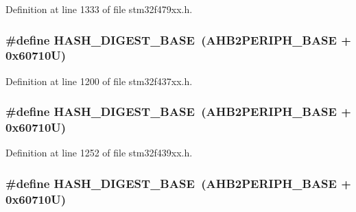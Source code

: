 Definition at line 1333 of file stm32f479xx.\+h.

\subsubsection[{\texorpdfstring{H\+A\+S\+H\+\_\+\+D\+I\+G\+E\+S\+T\+\_\+\+B\+A\+SE}{HASH_DIGEST_BASE}}]{\setlength{\rightskip}{0pt plus 5cm}\#define H\+A\+S\+H\+\_\+\+D\+I\+G\+E\+S\+T\+\_\+\+B\+A\+SE~({\bf A\+H\+B2\+P\+E\+R\+I\+P\+H\+\_\+\+B\+A\+SE} + 0x60710\+U)}\hypertarget{group___peripheral__memory__map_ga41efdf0e6db11dad3003d01882ee8bcb}{}\label{group___peripheral__memory__map_ga41efdf0e6db11dad3003d01882ee8bcb}


Definition at line 1200 of file stm32f437xx.\+h.

\subsubsection[{\texorpdfstring{H\+A\+S\+H\+\_\+\+D\+I\+G\+E\+S\+T\+\_\+\+B\+A\+SE}{HASH_DIGEST_BASE}}]{\setlength{\rightskip}{0pt plus 5cm}\#define H\+A\+S\+H\+\_\+\+D\+I\+G\+E\+S\+T\+\_\+\+B\+A\+SE~({\bf A\+H\+B2\+P\+E\+R\+I\+P\+H\+\_\+\+B\+A\+SE} + 0x60710\+U)}\hypertarget{group___peripheral__memory__map_ga41efdf0e6db11dad3003d01882ee8bcb}{}\label{group___peripheral__memory__map_ga41efdf0e6db11dad3003d01882ee8bcb}


Definition at line 1252 of file stm32f439xx.\+h.

\subsubsection[{\texorpdfstring{H\+A\+S\+H\+\_\+\+D\+I\+G\+E\+S\+T\+\_\+\+B\+A\+SE}{HASH_DIGEST_BASE}}]{\setlength{\rightskip}{0pt plus 5cm}\#define H\+A\+S\+H\+\_\+\+D\+I\+G\+E\+S\+T\+\_\+\+B\+A\+SE~({\bf A\+H\+B2\+P\+E\+R\+I\+P\+H\+\_\+\+B\+A\+SE} + 0x60710\+U)}\hypertarget{group___peripheral__memory__map_ga41efdf0e6db11dad3003d01882ee8bcb}{}\label{group___peripheral__memory__map_ga41efdf0e6db11dad3003d01882ee8bcb}


